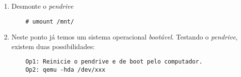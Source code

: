 \documentclass[a4paper,10pt]{article}
\begin{document}
\begin{enumerate}
    \item Desmonte o \emph{pendrive}
      \begin{lstlisting}
	# umount /mnt/
      \end{lstlisting}
    
     \item Neste ponto já temos um sistema operacional \emph{bootável}. Testando o \emph{pendrive}, 
	existem duas possibilidades:
      \begin{lstlisting}
	Op1: Reinicie o pendrive e de boot pelo computador.
	Op2: qemu -hda /dev/xxx
      \end{lstlisting}
  \end{enumerate}

\end{document}
